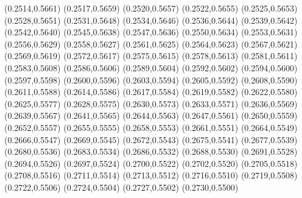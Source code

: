 \PST@Filltriangle(0.2514,0.5661)
\PST@Filltriangle(0.2517,0.5659)
\PST@Filltriangle(0.2520,0.5657)
\PST@Filltriangle(0.2522,0.5655)
\PST@Filltriangle(0.2525,0.5653)
\PST@Filltriangle(0.2528,0.5651)
\PST@Filltriangle(0.2531,0.5648)
\PST@Filltriangle(0.2534,0.5646)
\PST@Filltriangle(0.2536,0.5644)
\PST@Filltriangle(0.2539,0.5642)
\PST@Filltriangle(0.2542,0.5640)
\PST@Filltriangle(0.2545,0.5638)
\PST@Filltriangle(0.2547,0.5636)
\PST@Filltriangle(0.2550,0.5634)
\PST@Filltriangle(0.2553,0.5631)
\PST@Filltriangle(0.2556,0.5629)
\PST@Filltriangle(0.2558,0.5627)
\PST@Filltriangle(0.2561,0.5625)
\PST@Filltriangle(0.2564,0.5623)
\PST@Filltriangle(0.2567,0.5621)
\PST@Filltriangle(0.2569,0.5619)
\PST@Filltriangle(0.2572,0.5617)
\PST@Filltriangle(0.2575,0.5615)
\PST@Filltriangle(0.2578,0.5613)
\PST@Filltriangle(0.2581,0.5611)
\PST@Filltriangle(0.2583,0.5608)
\PST@Filltriangle(0.2586,0.5606)
\PST@Filltriangle(0.2589,0.5604)
\PST@Filltriangle(0.2592,0.5602)
\PST@Filltriangle(0.2594,0.5600)
\PST@Filltriangle(0.2597,0.5598)
\PST@Filltriangle(0.2600,0.5596)
\PST@Filltriangle(0.2603,0.5594)
\PST@Filltriangle(0.2605,0.5592)
\PST@Filltriangle(0.2608,0.5590)
\PST@Filltriangle(0.2611,0.5588)
\PST@Filltriangle(0.2614,0.5586)
\PST@Filltriangle(0.2617,0.5584)
\PST@Filltriangle(0.2619,0.5582)
\PST@Filltriangle(0.2622,0.5580)
\PST@Filltriangle(0.2625,0.5577)
\PST@Filltriangle(0.2628,0.5575)
\PST@Filltriangle(0.2630,0.5573)
\PST@Filltriangle(0.2633,0.5571)
\PST@Filltriangle(0.2636,0.5569)
\PST@Filltriangle(0.2639,0.5567)
\PST@Filltriangle(0.2641,0.5565)
\PST@Filltriangle(0.2644,0.5563)
\PST@Filltriangle(0.2647,0.5561)
\PST@Filltriangle(0.2650,0.5559)
\PST@Filltriangle(0.2652,0.5557)
\PST@Filltriangle(0.2655,0.5555)
\PST@Filltriangle(0.2658,0.5553)
\PST@Filltriangle(0.2661,0.5551)
\PST@Filltriangle(0.2664,0.5549)
\PST@Filltriangle(0.2666,0.5547)
\PST@Filltriangle(0.2669,0.5545)
\PST@Filltriangle(0.2672,0.5543)
\PST@Filltriangle(0.2675,0.5541)
\PST@Filltriangle(0.2677,0.5539)
\PST@Filltriangle(0.2680,0.5536)
\PST@Filltriangle(0.2683,0.5534)
\PST@Filltriangle(0.2686,0.5532)
\PST@Filltriangle(0.2688,0.5530)
\PST@Filltriangle(0.2691,0.5528)
\PST@Filltriangle(0.2694,0.5526)
\PST@Filltriangle(0.2697,0.5524)
\PST@Filltriangle(0.2700,0.5522)
\PST@Filltriangle(0.2702,0.5520)
\PST@Filltriangle(0.2705,0.5518)
\PST@Filltriangle(0.2708,0.5516)
\PST@Filltriangle(0.2711,0.5514)
\PST@Filltriangle(0.2713,0.5512)
\PST@Filltriangle(0.2716,0.5510)
\PST@Filltriangle(0.2719,0.5508)
\PST@Filltriangle(0.2722,0.5506)
\PST@Filltriangle(0.2724,0.5504)
\PST@Filltriangle(0.2727,0.5502)
\PST@Filltriangle(0.2730,0.5500)
